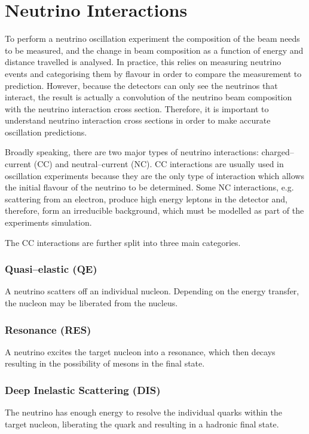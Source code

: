 \section{Neutrino Interactions} \label{nu_prod}

To perform a neutrino oscillation experiment the composition of the beam needs
to be measured, and the change in beam composition as a function of energy and
distance travelled is analysed. In practice, this relies on measuring
neutrino events and categorising them by flavour in order to compare the
measurement to prediction. However, because the detectors can only see the 
neutrinos that interact, the result is actually a convolution of the neutrino 
beam composition with the neutrino interaction cross section. Therefore, it is 
important to understand neutrino interaction cross sections in order to make 
accurate oscillation predictions.

Broadly speaking, there are two major types of neutrino interactions:
charged--current (CC) and neutral--current (NC). CC interactions are usually 
used in oscillation experiments because they are the only type of interaction 
which allows the initial flavour of the neutrino to be determined. Some 
NC interactions, e.g. scattering from an electron, produce high energy leptons 
in the detector and, therefore, form an irreducible background, which must 
be modelled as part of the experiments simulation.

The CC interactions are further split into three main categories.

\subsubsection*{Quasi--elastic (QE)}
A neutrino scatters off an individual nucleon. Depending on the energy 
transfer, the nucleon may be liberated from the nucleus.
\subsubsection*{Resonance (RES)}
A neutrino excites the target nucleon into a resonance, which then decays
resulting in the possibility of mesons in the final state.
\subsubsection*{Deep Inelastic Scattering (DIS)}
The neutrino has enough energy to resolve the individual quarks within the
target nucleon, liberating the quark and resulting in a hadronic final state.


